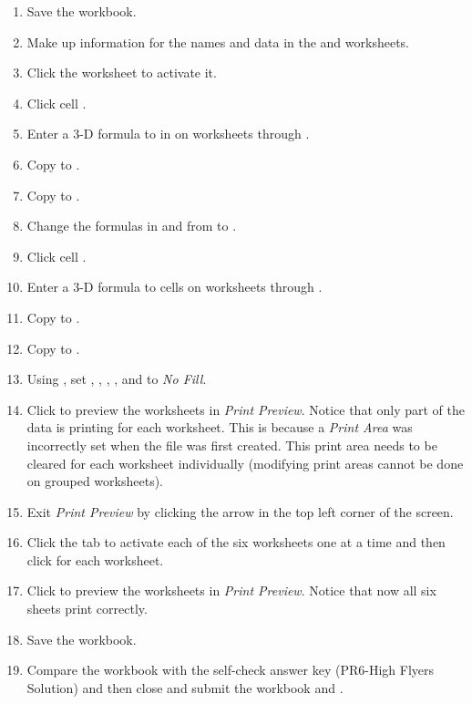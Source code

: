 \begin{enumbox}
	\begin{enumerate}
		\item Save the  workbook.
		\item Make up information for the names and data in the  and  worksheets.
		\item Click the  worksheet to activate it.
	
		\item Click cell . 
		\item Enter a $ 3 $-D formula to  in  on worksheets  through . 
		\item Copy  to .
		\item Copy  to .
		\item Change the formulas in  and  from  to .
		\item Click cell . 
		\item Enter a $ 3 $-D formula to  cells  on worksheets  through . 
		\item Copy  to .
		\item Copy  to .
		\item Using , set , , , , and  to \textit{No Fill}. 
		\item Click  to preview the worksheets in \textit{Print Preview}. Notice that only part of the data is printing for each worksheet. This is because a \textit{Print Area} was incorrectly set when the file was first created. This print area needs to be cleared for each worksheet individually (modifying print areas cannot be done on grouped worksheets). 
		\item Exit \textit{Print Preview} by clicking the arrow in the top left corner of the screen. 
		\item Click the tab to activate each of the six worksheets one at a time and then click  for each worksheet.
		\item Click  to preview the worksheets in \textit{Print Preview}. Notice that now all six sheets print correctly.
		\item Save the  workbook.
		\item Compare the workbook with the self-check answer key (PR6-High Flyers Solution) and then close and submit the  workbook and .
	\end{enumerate}
\end{enumbox}
	
